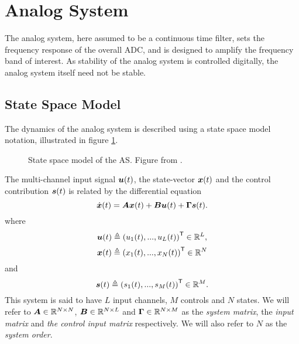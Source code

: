 \section{Analog System}
\label{subsec:analog_system}
The analog system, here assumed to be a continuous time filter, sets the frequency response of the overall ADC, and is designed to amplify the frequency band of interest. As stability of the analog system is controlled digitally, the analog system itself need not be stable.

\subsection{State Space Model}
The dynamics of the analog system is described using a state space model notation, illustrated in figure \ref{fig:as_state_space_model}.
\begin{figure}[htbp]
    
    \centering
    \caption{State space model of the AS. Figure from \cite{malmberg_thesis}.}
    \label{fig:as_state_space_model}
\end{figure}
The multi-channel input signal $\bm{u}(t)$, the state-vector $\bm{x}(t)$ and the control contribution $\bm{s}(t)$ is related by the differential equation
\begin{equation}
    \label{eq:state_space_equations}
    \dot{\bm{x}}(t) = \bm{A}\bm{x}(t) + \bm{B}\bm{u}(t) + \bm{\Gamma}\bm{s}(t).
\end{equation}
where
\begin{equation}
    \label{eq:def_input_sig}
    \bm{u}(t) \triangleq \left( u_1(t),..., u_L(t) \right)^\mathsf{T} \in \mathbb{R}^L,
\end{equation}
\begin{equation}
    \label{eq:def_state_vector}
    \bm{x}(t) \triangleq \left( x_1(t),..., x_N(t) \right)^\mathsf{T} \in \mathbb{R}^N
\end{equation}
and
\begin{equation}
    \label{eq:def_control_contribution}
    \bm{s}(t) \triangleq \left( s_1(t),..., s_M(t) \right)^\mathsf{T} \in \mathbb{R}^M.
\end{equation}
This system is said to have $L$ input channels, $M$ controls and $N$ states. We will refer to $\bm{A} \in \mathbb{R}^{N \times N}$, $\bm{B} \in \mathbb{R}^{N \times L}$ and $\bm{\Gamma} \in \mathbb{R}^{N \times M}$ as the \textit{system matrix}, the \textit{input matrix} and \textit{the control input matrix} respectively. We will also refer to $N$ as the \textit{system order}.

